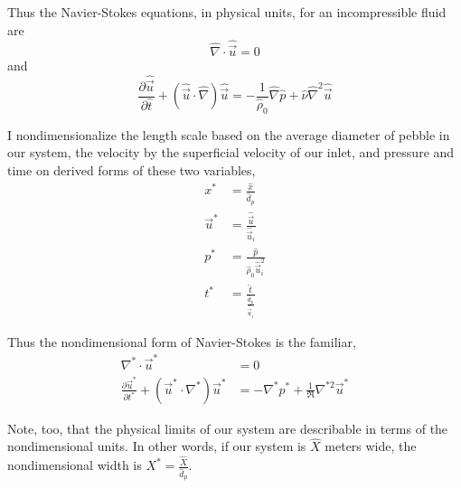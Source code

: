 Thus the Navier-Stokes equations, in physical units, for an incompressible fluid are
\begin{equation}
	\hat{\nabla}\cdot\hat{\vec{u}} = 0
\end{equation}
and
\begin{equation}
	\frac{\partial \hat{\vec{u}}}{\partial \hat{t}} + (\hat{\vec{u}}\cdot\hat{\nabla})\hat{\vec{u}} = -\frac{1}{\hat{\rho}_0}\hat{\nabla}\hat{p} + \hat{\nu}\hat{\nabla}^2\hat{\vec{u}}
\end{equation}

I nondimensionalize the length scale based on the average diameter of pebble in our system, the velocity by the superficial velocity of our inlet, and pressure and time on derived forms of these two variables,
\begin{subequations}
\begin{align}
	x^* &= \frac{\hat{x}}{\hat{d}_p} \\
	\vec{u}^* &= \frac{\hat{\vec{u}}}{\hat{\vec{u}}_i} \\
	p^* &= \frac{\hat{p}}{\hat{\rho}_0\hat{\vec{u}}_i^2}\\
	t^* &= \frac{\hat{t}}{\frac{\hat{d}_p}{\hat{\vec{u}}_i}}
\end{align}
\end{subequations}

Thus the nondimensional form of Navier-Stokes is the familiar,
\begin{subequations}\label{eq:non-dim-ns}
\begin{align}
	\nabla^* \cdot \vec{u}^* &= 0 \\
	\frac{\partial \vec{u}^*}{\partial t^*} + (\vec{u}^*\cdot\nabla^*)\vec{u}^* &= -\nabla^*p^* + \frac{1}{\Re}\nabla^{*2}\vec{u}^*
\end{align}
\end{subequations}

Note, too, that the physical limits of our system are describable in terms of the nondimensional units. In other words, if our system is $\hat{X}$ meters wide, the nondimensional width is $X^*=\frac{\hat{X}}{\hat{d}_p}$.  


